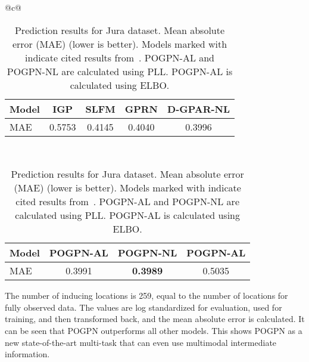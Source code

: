 \begin{table}[h]
      \centering
      \begin{tabular}{@{}c@{}}
            \begin{tabular}{@{\hskip 0pt}lcccc@{\hskip 0pt}}
                  \toprule
                  Model & IGP\textsuperscript{\textdagger} & SLFM\textsuperscript{\textdagger} & GPRN\textsuperscript{\textdagger} & D-GPAR-NL\textsuperscript{\textdagger} \\
                  \midrule
                  MAE   & 0.5753                           & 0.4145                            & 0.4040                            & 0.3996                                 \\
                  \bottomrule
            \end{tabular}
            \\[2em] %

            \begin{tabular}{@{\hskip 0pt}lccc@{\hskip 0pt}}
                  \toprule
                  Model & POGPN-AL\textsuperscript{\textdaggerdbl} & POGPN-NL\textsuperscript{\textdaggerdbl} & POGPN-AL\textsuperscript{\textasteriskcentered} \\
                  \midrule
                  MAE   & 0.3991
                        & \textbf{0.3989}                          & 0.5035                                                                                     \\
                  \bottomrule
            \end{tabular}
      \end{tabular}
      \caption{Prediction results for Jura dataset. Mean absolute error (MAE) (lower is better). Models marked with \textsuperscript{\textdagger} indicate cited results from~\cite{requeima2019gaussian}. POGPN-AL\textsuperscript{\textdaggerdbl} and POGPN-NL\textsuperscript{\textdaggerdbl} are calculated using PLL. POGPN-AL\textsuperscript{\textasteriskcentered} is calculated using ELBO.}
      \vspace{-1em}
\end{table}

The number of inducing locations is 259, equal to the number of locations for fully observed data. The values are log standardized for evaluation, used for training, and then transformed back, and the mean absolute error is calculated. It can be seen that POGPN outperforms all other models. This shows POGPN as a new state-of-the-art multi-task that can even use multimodal intermediate information.


